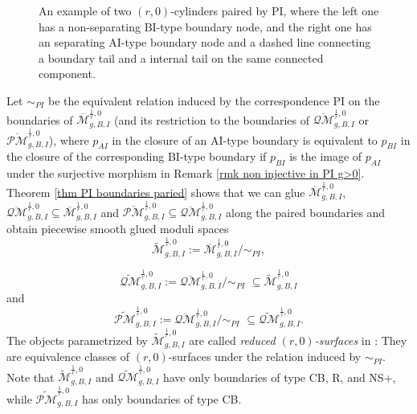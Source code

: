 \documentclass[11pt]{amsart}
\theoremstyle{definition}
\theoremstyle{remark}
\newcommand{\oPMb}{{\overline{\mathcal{PM}}}}
\newcommand{\oQMb}{{\overline{\mathcal{QM}}}}
\newcommand{\<}{\left<}
\renewcommand{\>}{\right>}
\numberwithin{equation}{section}
\def\Mbar{{\overline{\mathcal M}}}
\def\PI{{\text{PI}}}
\def\PI{\text{PI}}
\begin{document}
\begin{figure}
\begin{subfigure}{.45\textwidth}
\begin{tikzpicture}[scale=0.5]
\end{tikzpicture}
        \end{subfigure}
        \caption{An example of two $(r,0)$-cylinders paired by $\PI$, where the left one has a non-separating BI-type boundary node, and the right one has an separating AI-type %
boundary node and %
a dashed line connecting a boundary tail and a internal tail on the same connected component.}
        \label{fig point insertion at non separationg}
    \end{figure}
 

  Let $\sim_{PI}$ be the equivalent relation induced by the correspondence $\PI$ on the boundaries of $\Mbar^{\frac{1}{r},0}_{g,B,I}$ (and its restriction to the boundaries of $\oQMb^{\frac{1}{r},0}_{g,B,I}$ or $\oPMb^{\frac{1}{r},0}_{g,B,I}$), where $p_{AI}$ in the closure of an AI-type boundary is equivalent to $p_{BI}$ in the closure of the corresponding BI-type boundary if $p_{BI}$ is the image of $p_{AI}$ under the surjective morphism in Remark \ref{rmk non injective in PI g>0}. Theorem \ref{thm  PI boundaries paried} shows that we can glue $\Mbar^{\frac{1}{r},0}_{g,B,I}$, $\oQMb^{\frac{1}{r},0}_{g,B,I}\subseteq \Mbar^{\frac{1}{r},0}_{g,B,I}$ and $\oPMb^{\frac{1}{r},0}_{g,B,I}\subseteq \oQMb^{\frac{1}{r},0}_{g,B,I}$ along the paired boundaries and obtain piecewise smooth glued moduli %
spaces
    $$
    \widetilde{\mathcal M}^{\frac{1}{r},0}_{g,B,I}:=\Mbar^{\frac{1}{r},0}_{g,B,I}\big/\sim_{PI},
    $$
    
    $$
    \widetilde{\mathcal{QM}}^{\frac{1}{r},0}_{g,B,I}:=\overline{\mathcal{QM}}^{\frac{1}{r},0}_{g,B,I}\big/\sim_{PI} \,\, \subseteq \widetilde{\mathcal M}^{\frac{1}{r},0}_{g,B,I}
    $$
    and %
    $$
     \widetilde{\mathcal{PM}}^{\frac{1}{r},0}_{g,B,I}:=\overline{\mathcal{QM}}^{\frac{1}{r},0}_{g,B,I}\big/\sim_{PI} \,\,\subseteq \widetilde{\mathcal{QM}}^{\frac{1}{r},0}_{g,B,I}.
    $$
    The objects parametrized by %
$\widetilde{\mathcal M}^{\frac{1}{r},0}_{g,B,I}$  are called \textit{reduced $(r,0)$-surfaces} in \cite{TZ1}: They are %
equivalence classes of $(r,0)$-surfaces under the relation induced by $\sim_{PI}$. Note that $\widetilde{\mathcal M}^{\frac{1}{r},0}_{g,B,I}$ and $\widetilde{\mathcal {QM}}^{\frac{1}{r},0}_{g,B,I}$ have only boundaries of type CB, R, and NS+, while $\widetilde{\mathcal {PM}}^{\frac{1}{r},0}_{g,B,I}$ has only boundaries of type CB.
    
\end{document}
